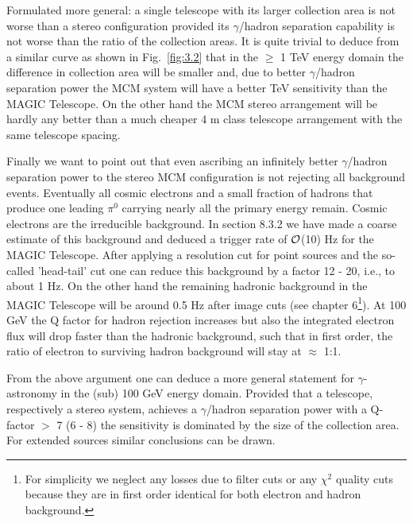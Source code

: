 Formulated more general: a single telescope with its larger
collection area is not worse than a stereo configuration
provided its $\gamma$/hadron separation capability is not
worse than the ratio of the collection areas.  It is quite
trivial to deduce from a similar curve as shown in
Fig.~\ref{fig:3.2} that in the $\geq$ 1 TeV energy domain
the difference in collection area will be smaller and, due
to better $\gamma$/hadron separation power the MCM system
will have a better TeV sensitivity than the MAGIC
Telescope. On the other hand the MCM stereo arrangement will
be hardly any better than a much cheaper 4 m class telescope
arrangement with the same telescope spacing.

Finally we want to point out that even ascribing an
infinitely better $\gamma$/hadron separation power to the
stereo MCM configuration is not rejecting all background
events.  Eventually all cosmic electrons and a small
fraction of hadrons that produce one leading $\pi^0$
carrying nearly all the primary energy remain.  Cosmic
electrons are the irreducible background. In section 8.3.2
we have made a coarse estimate of this background and
deduced a trigger rate of $\cal{O}$(10) Hz for the MAGIC
Telescope. After applying a resolution cut for point sources
and the so-called 'head-tail' cut one can reduce this
background by a factor 12 - 20, i.e., to about 1 Hz. On the
other hand the remaining hadronic background in the MAGIC
Telescope will be around 
0.5 Hz after image cuts (see
chapter 6\footnote{For simplicity we neglect any losses due
to filter cuts or any $\chi^2$ quality cuts because they are
in first order identical for both electron and hadron
background.}).  At 100 GeV the Q factor for hadron rejection
increases but also the integrated electron flux will drop
faster than the hadronic background, such that in first
order, the ratio of electron to surviving hadron background
will stay at $\approx$ 1:1.

From the above argument one can deduce a more general
statement for $\gamma$-astronomy in the (sub) 100 GeV energy
domain. Provided that a telescope, respectively a stereo
system, achieves a $\gamma$/hadron separation power with a
Q-factor $>$ 7 (6 - 8) the sensitivity is dominated by the
size of the collection area.  For extended sources similar
conclusions can be drawn.
\cleardoublepage
{}

\hspace{3cm}
\vfill
\newpage
\begin{figure}[t]
\leavevmode
\centering
\epsfxsize=14cm
\end{figure}
\newpage

